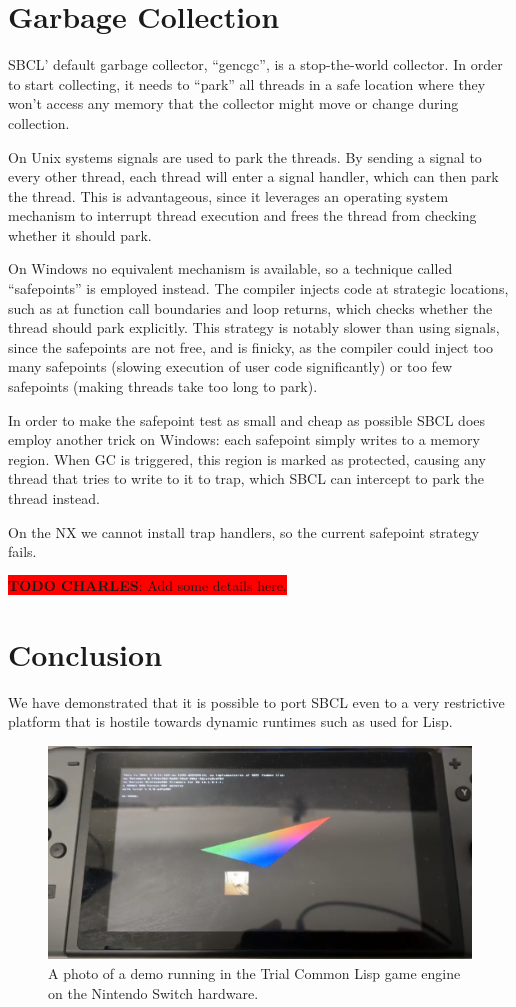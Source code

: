 \documentclass[format=sigconf]{acmart}
\begin{document}
\section{Garbage Collection}\label{gc}
SBCL' default garbage collector, ``gencgc'', is a stop-the-world collector. In order to start collecting, it needs to ``park'' all threads in a safe location where they won't access any memory that the collector might move or change during collection.

On Unix systems signals are used to park the threads. By sending a signal to every other thread, each thread will enter a signal handler, which can then park the thread. This is advantageous, since it leverages an operating system mechanism to interrupt thread execution and frees the thread from checking whether it should park.

On Windows no equivalent mechanism is available, so a technique called ``safepoints'' is employed instead. The compiler injects code at strategic locations, such as at function call boundaries and loop returns, which checks whether the thread should park explicitly. This strategy is notably slower than using signals, since the safepoints are not free, and is finicky, as the compiler could inject too many safepoints (slowing execution of user code significantly) or too few safepoints (making threads take too long to park).

In order to make the safepoint test as small and cheap as possible SBCL does employ another trick on Windows: each safepoint simply writes to a memory region. When GC is triggered, this region is marked as protected, causing any thread that tries to write to it to trap, which SBCL can intercept to park the thread instead.

On the NX we cannot install trap handlers, so the current safepoint strategy fails.

\colorbox{red}{
  \textbf{TODO CHARLES}: Add some details here.
}

\section{Conclusion}\label{conclusion}
We have demonstrated that it is possible to port SBCL even to a very restrictive platform that is hostile towards dynamic runtimes such as used for Lisp.

\begin{figure}[h]
  \centering
  \includegraphics[width=\linewidth]{photo.png}
  \caption{A photo of a demo running in the Trial Common Lisp game engine on the Nintendo Switch hardware.}
\end{figure}
\end{document}
